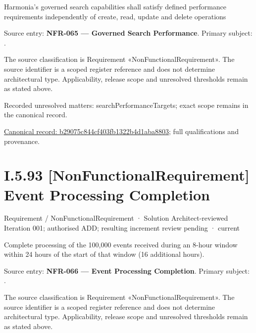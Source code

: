 Harmonia's governed search capabilities shall satisfy defined performance requirements independently of create, read, update and delete operations



Source entry: \textbf{NFR-065 — Governed Search Performance}. Primary subject: \texttt{}.



The source classification is Requirement «NonFunctionalRequirement». The source identifier is a scoped register reference and does not determine architectural type. Applicability, release scope and unresolved thresholds remain as stated above.


{\small Recorded unresolved matters: searchPerformanceTargets; exact scope remains in the canonical record.}\par
{\footnotesize \href{../../../../../../../../continuum/motivation/requirement/non-functional-requirement/b29075c844cf403fb1322b4d1aba8803.md}{Canonical record: b29075c844cf403fb1322b4d1aba8803}; full qualifications and provenance.}\par
\section*{I.5.93 [NonFunctionalRequirement] Event Processing Completion}
\label{navigation:I.5.93}

\label{element:d1380eec700a492b810354e0798c8146}
{\small Requirement / NonFunctionalRequirement · Solution Architect-reviewed Iteration 001; authorised ADD; resulting increment review pending · current}\par

Complete processing of the 100,000 events received during an 8-hour window within 24 hours of the start of that window (16 additional hours).



Source entry: \textbf{NFR-066 — Event Processing Completion}. Primary subject: \texttt{}.



The source classification is Requirement «NonFunctionalRequirement». The source identifier is a scoped register reference and does not determine architectural type. Applicability, release scope and unresolved thresholds remain as stated above.


